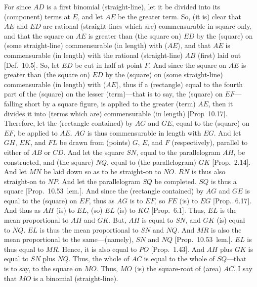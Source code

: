 \begin{Parallel}{}{}
{For since $AD$ is a first binomial (straight-line), let it be divided
into its (component) terms at $E$, and let $AE$ be the greater term.
So, (it is) clear that $AE$ and $ED$ are rational (straight-lines which are)
commensurable in square only, and that the square on $AE$ is greater
than (the square on) $ED$ by the (square) on (some straight-line)
commensurable (in length) with ($AE$), and that $AE$ is commensurable 
(in length) with
the rational (straight-line) $AB$ (first) laid out [Def.~10.5]. So, let $ED$ be cut in half
at  point $F$. And since the square on $AE$ is greater than (the square on)
$ED$ by the (square) on (some straight-line) commensurable (in length) with ($AE$),
thus if a (rectangle) equal to the fourth part of the (square) on the lesser (term)---that is to say, the (square) on $EF$---falling short by a square figure,
is applied to the greater (term) $AE$, then it divides it into (terms which are)
commensurable (in length) [Prop~10.17]. 
Therefore, let the (rectangle contained) by $AG$ and $GE$, equal to
the (square) on $EF$, be applied to $AE$. $AG$ 
is thus commensurable in length with $EG$. And let $GH$, $EK$, and $FL$
be drawn from (points) $G$, $E$, and $F$ (respectively), parallel to
either of $AB$ or $CD$. And let the square $SN$, equal to the
parallelogram $AH$, be constructed, and (the square) $NQ$,
equal to (the parallelogram) $GK$ [Prop.~2.14].
And let $MN$ be laid down so as to be straight-on to $NO$. $RN$
is thus also straight-on to $NP$. And let the parallelogram $SQ$ 
be completed. $SQ$ is thus a square [Prop.~10.53~lem.].  And since the (rectangle
contained) by $AG$ and $GE$ is equal to the (square) on $EF$, thus as
$AG$ is to $EF$, so $FE$ (is) to $EG$ [Prop.~6.17]. And thus as $AH$ (is) to
$EL$, (so) $EL$ (is) to $KG$ [Prop.~6.1]. Thus,
$EL$ is the mean proportional to $AH$ and $GK$. But, $AH$ is equal to
$SN$, and $GK$ (is) equal to $NQ$. $EL$ is thus the mean proportional
to $SN$ and $NQ$. And $MR$ is also the mean proportional to the
same---(namely), $SN$ and $NQ$ [Prop.~10.53~lem.]. $EL$ is thus equal to $MR$.
Hence, it is also equal to $PO$ [Prop.~1.43]. And
$AH$ plus $GK$ is equal to $SN$ plus $NQ$. Thus, the whole of $AC$
is equal to the whole of $SQ$---that is to say, to the square on $MO$.
Thus, $MO$ (is) the square-root of (area) $AC$.  I say that $MO$ is a
binomial (straight-line).

}
\end{Parallel}
